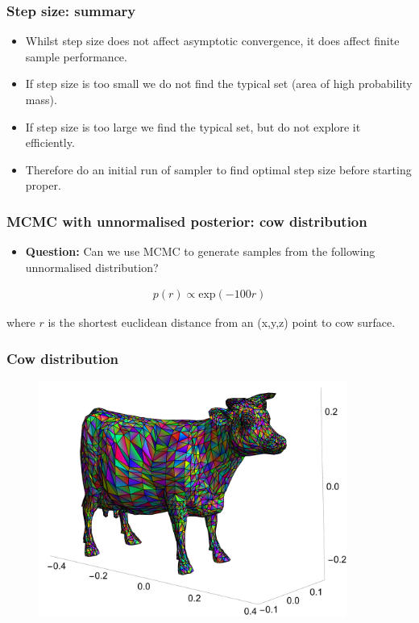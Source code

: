 \documentclass[handout]{beamer}
\begin{document}
\begin{frame}
\frametitle{Step size: summary}
\begin{itemize}
\item<2-> Whilst step size does not affect asymptotic convergence, it does affect finite sample performance.
\item<3-> If step size is too small we do not find the typical set (area of high probability mass). 
\item<4-> If step size is too large we find the typical set, but do not explore it efficiently.
\item<5-> Therefore do an initial run of sampler to find optimal step size before starting proper.
\end{itemize}

\end{frame}


\begin{frame}
	\frametitle{MCMC with unnormalised posterior: cow distribution}
	
	\begin{itemize}
		\item<3-> \textbf{Question:} Can we use MCMC to generate samples from the following unnormalised distribution?
	\end{itemize}
	
	\begin{eqnarray}
	p(r) \propto \text{exp}(-100 r)
	\end{eqnarray}
	
	 where $r$ is the shortest euclidean distance from an (x,y,z) point to cow surface.
	
\end{frame}

\begin{frame}
	\frametitle{Cow distribution}
	
	\begin{figure}[ht]
		\centerline{\includegraphics[width=0.9\textwidth]{animations_figures/lec4_cow.png}}
	\end{figure}
	
\end{frame}
\end{document}
